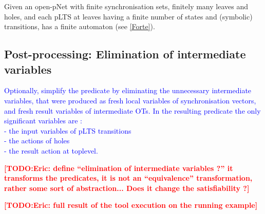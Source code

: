 \documentclass{lncs/llncs}
\newcommand{\TODO}[1]{\textcolor{red}{\textbf{[TODO:#1]}}}
\newcommand{\ERIC}[1]{\textcolor{blue}{#1}}
\begin{document}
Given an open-pNet
with finite synchronisation sets, finitely many leaves and
holes, and each pLTS at leaves having a finite number of states and
(symbolic) transitions, has a finite automaton (see \ref{Forte}).

\subsection{Post-processing: Elimination of intermediate variables}

\ERIC{Optionally, simplify the predicate by eliminating the unnecessary intermediate variables, that were produced as fresh local variables of synchronisation vectors, and fresh result variables of intermediate OTs. In the resulting predicate the only significant variables are :\\
- the input variables of pLTS transitions\\
- the actions of holes\\
- the result action at toplevel.}

  \TODO{Eric: define ``elimination of intermediate variables ?'' it
    transforms the predicates, it is not an
    ``equivalence'' transformation, rather some sort of
    abstraction... Does it change the satisfiability ?}







\TODO{Eric: full result of the tool execution on the running example}
\end{document}
